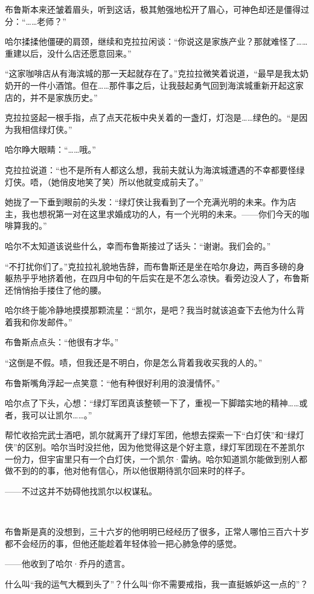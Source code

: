 \documentclass[../main]{subfiles}
\begin{document}
布鲁斯本来还皱着眉头，听到这话，极其勉强地松开了眉心，可神色却还是僵得过分：“……老师？”

哈尔揉揉他僵硬的肩颈，继续和克拉拉闲谈：“你说这是家族产业？那就难怪了……重建以后，没什么店还愿意回来。”

“这家咖啡店从有海滨城的那一天起就存在了。”克拉拉微笑着说道，“最早是我太奶奶开的一件小酒馆。但在……那件事之后，让我鼓起勇气回到海滨城重新开起这家店的，并不是家族历史。”

克拉拉竖起一根手指，点了点天花板中央关着的一盏灯，灯泡是……绿色的。“是因为我相信绿灯侠。”

哈尔睁大眼睛：“……哦。”

克拉拉说道：“也不是所有人都这么想，我前夫就认为海滨城遭遇的不幸都要怪绿灯侠。唔，（她俏皮地笑了笑）所以他就变成前夫了。”

她拢了一下垂到眼前的头发：“绿灯侠让我看到了一个充满光明的未来。作为店主，我也想祝第一对在这里求婚成功的人，有一个光明的未来。——你们今天的咖啡算我的。”

哈尔不太知道该说些什么，幸而布鲁斯接过了话头：“谢谢。我们会的。”

“不打扰你们了。”克拉拉礼貌地告辞，而布鲁斯还是坐在哈尔身边，两百多磅的身躯热乎乎地挤着他，在四月中旬的午后实在是不怎么凉快。看旁边没人了，布鲁斯还悄悄抬手搂住了他的腰。

哈尔终于能冷静地摸摸那颗流星：“凯尔，是吧？我当时就该追查下去他为什么背着我和你发邮件。”

布鲁斯点点头：“他很有才华。”

“这倒是不假。啧，但我还是不明白，你是怎么背着我收买我的人的。”

布鲁斯嘴角浮起一点笑意：“他有种很好利用的浪漫情怀。”

哈尔点了下头，心想：“绿灯军团真该整顿一下了，重视一下脚踏实地的精神……或者，我可以让凯尔……。”

帮忙收拾完武士酒吧，凯尔就离开了绿灯军团，他想去探索一下“白灯侠”和“绿灯侠”的区别。哈尔当时没拦他，因为他觉得这是个好主意，绿灯军团现在不差凯尔一份力，但宇宙里只有一个白灯侠，一个凯尔·雷纳。哈尔知道凯尔能做到别人都做不到的的事，他对他有信心，所以他很期待凯尔回来时的样子。

——不过这并不妨碍他找凯尔以权谋私。

~\

布鲁斯是真的没想到，三十六岁的他明明已经经历了很多，正常人哪怕三百六十岁都不会经历的事，但他还能趁着年轻体验一把心肺急停的感觉。

——他收到了哈尔·乔丹的遗言。

什么叫“我的运气大概到头了”？什么叫“你不需要戒指，我一直挺嫉妒这一点的”？
\end{document}
